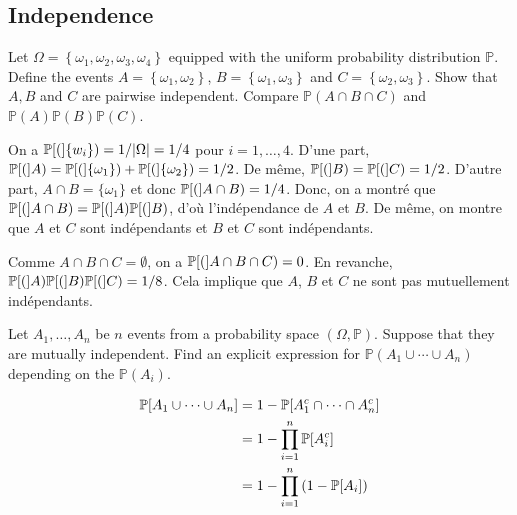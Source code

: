 \begin{center}
  \section*{Independence}
\end{center}

\begin{Exercise}[origin=Independent events]
  Let $\Omega=\left\{\omega_{1}, \omega_{2}, \omega_{3}, \omega_{4}\right\}$ equipped with the uniform probability distribution $\mathbb{P}$. Define the events $A=\left\{\omega_{1}, \omega_{2}\right\}$, $B=\left\{\omega_{1}, \omega_{3}\right\}$ and $C=\left\{\omega_{2}, \omega_{3}\right\}$.
  Show that $A, B$ and $C$ are pairwise independent. Compare $\mathbb{P}(A \cap B \cap C)$ and $\mathbb{P}(A) \mathbb{P}(B) \mathbb{P}(C)$.
\end{Exercise}

\vspace{0.5cm}

\begin{solution}
  On a $\mathbb{P}[(]\{w_i\})=1/|\Omega|=1/4$ pour $i=1,\dots,4$.
  D'une part, $\mathbb{P}[(]A)=\mathbb{P}[(]\{\omega_1\})+\mathbb{P}[(]\{\omega_2\})=1/2$. De même, $\mathbb{P}[(]B)=\mathbb{P}[(]C)=1/2$. D'autre part, $A\cap B=\{\omega_1\}$ et donc $\mathbb{P}[(]A\cap B)=1/4$. Donc, on a montr\'e que
  $\mathbb{P}[(]A\cap B)=\mathbb{P}[(]A)\mathbb{P}[(]B)$, d'où l'ind\'ependance de $A$ et $B$. De même, on montre que $A$ et $C$ sont ind\'ependants et $B$ et $C$ sont ind\'ependants.

  Comme $A \cap B \cap C=\emptyset$, on a  $\mathbb{P}[(]A \cap B \cap C)=0$. En revanche, $\mathbb{P}[(]A) \mathbb{P}[(]B) \mathbb{P}[(]C)=1/8$. Cela implique que $A$, $B$ et $C$ ne sont pas mutuellement ind\'ependants.
\end{solution}

\begin{Exercise}
  Let $A_1, \ldots , A_n$ be $n$ events from a probability space $(\Omega, \mathbb{P})$.
  Suppose that they are mutually independent. Find an explicit expression for $\mathbb{P}(A_1 \cup \cdots \cup A_n)$ depending on the $\mathbb{P}(A_i)$.
\end{Exercise}

\begin{solution}
  \begin{align*}
    \mathbb{P}[A_1 \cup \cdots \cup A_n] & = 1- \mathbb{P}[A_1^c \cap \cdots \cap A_n^c]             \\
                                     & = 1- \prod_{i = 1}^{n} \mathbb{P}[A_i^c]                  \\
                                     & = 1- \prod_{i = 1}^{n} \left( 1 - \mathbb{P}[A_i] \right)
  \end{align*}
\end{solution}

